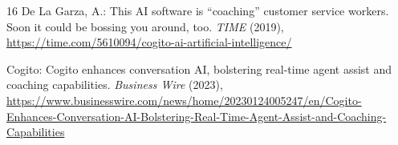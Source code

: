\documentclass[11pt, a4paper]{article}
\begin{document}
\begin{thebibliography}{16}
De La Garza, A.: This AI software is ``coaching'' customer service workers. Soon it could be bossing you around, too. \textit{TIME} (2019), \url{https://time.com/5610094/cogito-ai-artificial-intelligence/}

Cogito: Cogito enhances conversation AI, bolstering real-time agent assist and coaching capabilities. \textit{Business Wire} (2023), \url{https://www.businesswire.com/news/home/20230124005247/en/Cogito-Enhances-Conversation-AI-Bolstering-Real-Time-Agent-Assist-and-Coaching-Capabilities}

\end{thebibliography}
\end{document}
